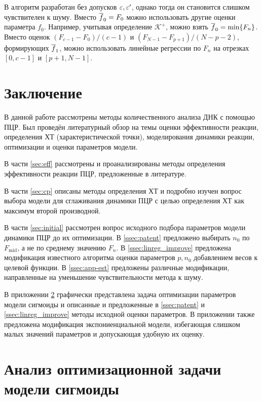 В \cite{orekhovUnsupervisedMachineLearning2023} алгоритм разработан без
допусков $\varepsilon,\varepsilon'$, однако тогда он становится слишком чувствителен к шуму.
Вместо $\overline{f}_0=F_0$ можно использовать другие оценки параметра $f_0$.
Например, учитывая определение $\mathcal K^{+}$, можно взять
$\overline{f}_0=\min\{F_{n}\}$. Вместо оценок $(F_{c-1}-F_0)/(c-1)$ и
$(F_{N-1}-F_{p+1})/(N-p-2)$, формирующих $\overline{f}_1$, можно использовать
линейные регрессии по $F_{n}$ на отрезках $[0,c-1]$ и $[p+1,N-1]$.

\section{Заключение}

В данной работе рассмотрены методы количественного анализа ДНК с помощью
ПЦР. Был проведён литературный обзор на темы оценки эффективности реакции,
определения ХТ (характеристической точки), моделирования динамики реакции,
оптимизации и оценки параметров модели.

В части \ref{sec:eff} рассмотрены и проанализированы методы определения
эффективности реакции ПЦР, предложенные в литературе.

В части \ref{sec:cp} описаны методы определения ХТ и подробно изучен вопрос
выбора модели для сглаживания динамики ПЦР с целью определения ХТ как максимум
второй производной.

В части \ref{sec:initial} рассмотрен вопрос исходного подбора параметров модели
динамики ПЦР до их оптимизации. В \ref{ssec:patent} предложено выбирать $n_0$
по $F_{\text{mid}}$, а не по среднему значению $F_{n}$. В
\ref{ssec:linreg_improve} предложена модификация известного алгоритма оценки
параметров $p,n_0$ добавлением весов к целевой функции. В \ref{ssec:app-est}
предложены различные модификации, направленные на уменьшение чувствительности
метода к шуму.

В приложении \ref{app:opt_an} графически представлена задача оптимизации
параметров модели сигмоиды и описанные и предложенные в \ref{ssec:patent} и
\ref{ssec:linreg_improve} методы исходной оценки параметров. В приложении также
предложена модификация экспониенциальной модели, избегающая слишком малых
значений параметров и допускающая удобную их оценку.

\newpage

\showbib{}

\newpage

\appendix{}

\section{Анализ оптимизационной задачи модели сигмоиды}\label{app:opt_an}

